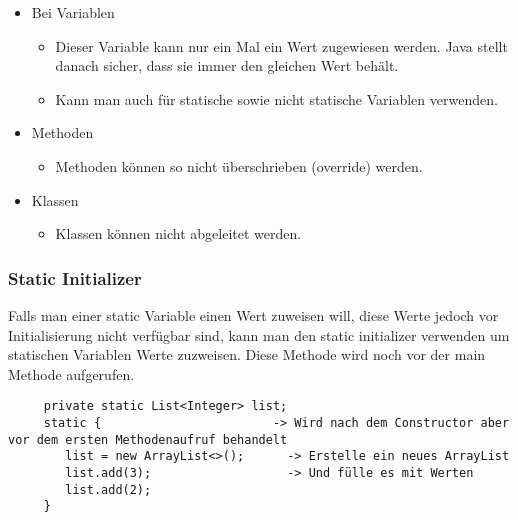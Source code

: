 \documentclass{article}
\begin{document}
	\begin{itemize}
	 	\item{Bei Variablen}
	 	\begin{itemize}
	 		\item{Dieser Variable kann nur ein Mal ein Wert zugewiesen werden. Java stellt danach sicher, dass sie immer den gleichen Wert behält.}
	 		\item{Kann man auch für statische sowie nicht statische Variablen verwenden.}
	 	\end{itemize}
	 	\item{Methoden}
	 	\begin{itemize}
	 		\item{Methoden können so nicht überschrieben (override) werden.}
	 	\end{itemize}
	 	\item{Klassen}
	 	\begin{itemize}
	 		\item{Klassen können nicht abgeleitet werden.}
	 	\end{itemize}
	 \end{itemize} 
	 \subsubsection{Static Initializer}
	 Falls man einer static Variable einen Wert zuweisen will, diese Werte jedoch vor Initialisierung nicht verfügbar sind, kann man den static initializer verwenden um statischen Variablen Werte zuzweisen. Diese Methode wird noch vor der main Methode aufgerufen. \\
	 \begin{verbatim}
	 private static List<Integer> list;
	 static {                        -> Wird nach dem Constructor aber vor dem ersten Methodenaufruf behandelt
	 	list = new ArrayList<>();      -> Erstelle ein neues ArrayList
	 	list.add(3);                   -> Und fülle es mit Werten
	 	list.add(2);
	 }
	 \end{verbatim}
\end{document}
